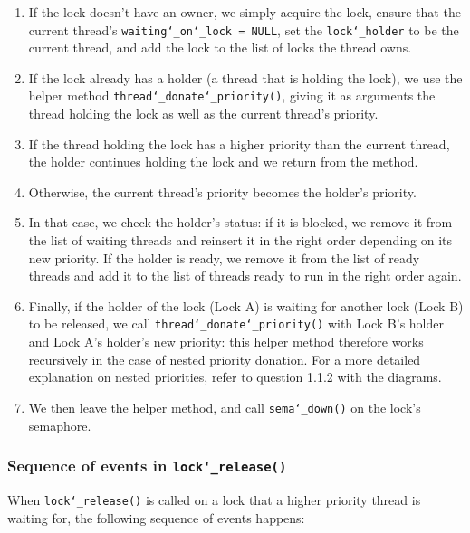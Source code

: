 \documentclass{article}
\renewcommand{\_}{\char`_}
\begin{document}
\begin{enumerate}

\item If the lock doesn't have an owner, we simply acquire the lock, ensure that the current thread's \texttt{waiting\_on\_lock = NULL},
set the \texttt{lock\_holder} to be the current thread, and add the lock to the list of locks the thread owns.

\item If the lock already has a holder (a thread that is holding the lock), we use the helper method \texttt{thread\_donate\_priority()}, giving it as arguments the thread holding the lock as well as the current thread's priority.

\item If the thread holding the lock has a higher priority than the current thread, the holder continues holding the lock and we return from the method.

\item Otherwise, the current thread's priority becomes the holder's priority.

\item In that case, we check the holder's status: if it is blocked, we remove it from the list of waiting threads and reinsert it in the right order depending on its new priority. If the holder is ready, we remove it from the list of ready threads and add it to the list of threads ready to run in the right order again.

\item Finally, if the holder of the lock (Lock A) is waiting for another lock (Lock B) to be released, we call \texttt{thread\_donate\_priority()} with Lock B's holder and Lock A's holder's new priority: this helper method therefore works recursively in the case of nested priority donation. For a more detailed explanation on nested priorities, refer to question 1.1.2 with the diagrams.

\item We then leave the helper method, and call \texttt{sema\_down()} on the lock's semaphore.

\end{enumerate}

\subsubsection{Sequence of events in \texttt{lock\_release()}}

When \texttt{lock\_release()} is called on a lock that a higher priority thread is waiting for, the following sequence of events happens:
\end{document}
